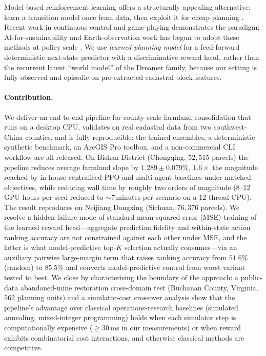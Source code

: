 \documentclass[11pt]{article}
\begin{document}
Model-based reinforcement learning offers a structurally appealing alternative: learn a transition model once from data, then exploit it for cheap planning \citep{chua2018deep,janner2019trust}. Recent work in continuous control \citep{hafner2025dreamerv3,hansen2024tdmpc2} and game-playing \citep{schrittwieser2020muzero,silver2017mastering} demonstrates the paradigm; AI-for-sustainability and Earth-observation work has begun to adopt these methods at policy scale \citep{rolnick2022tackling,reichstein2019deep,tuia2024artificial}. We use \emph{learned planning model} for a feed-forward deterministic next-state predictor with a discriminative reward head, rather than the recurrent latent ``world model'' of the Dreamer family, because our setting is fully observed and episodic on pre-extracted cadastral block features.

\paragraph{Contribution.} We deliver an end-to-end pipeline for county-scale farmland consolidation that runs on a desktop CPU, validates on real cadastral data from two southwest-China counties, and is fully reproducible: the trained ensembles, a deterministic synthetic benchmark, an ArcGIS Pro toolbox, and a non-commercial CLI workflow are all released. On Bishan District (Chongqing, $52{,}515$ parcels) the pipeline reduces average farmland slope by $1.289 \pm 0.079\%$, $1.6\times$ the magnitude reached by in-house centralised-PPO and multi-agent baselines under matched objectives, while reducing wall time by roughly two orders of magnitude (8--12 GPU-hours per seed reduced to $\sim$7\,minutes per scenario on a 12-thread CPU). The result reproduces on Neijiang Dongxing (Sichuan, $76{,}376$ parcels). We resolve a hidden failure mode of standard mean-squared-error (MSE) training of the learned reward head---aggregate prediction fidelity and within-state action ranking accuracy are not constrained against each other under MSE, and the latter is what model-predictive top-$K$ selection actually consumes---via an auxiliary pairwise large-margin term \citep{burges2005learning,joachims2002optimizing} that raises ranking accuracy from $51.6\%$ (random) to $85.5\%$ and converts model-predictive control from worst variant tested to best. We close by characterising the boundary of the approach: a public-data abandoned-mine restoration cross-domain test (Buchanan County, Virginia, $562$ planning units) and a simulator-cost crossover analysis show that the pipeline's advantage over classical operations-research baselines (simulated annealing, mixed-integer programming) holds when each simulator step is computationally expensive ($\geq 30$\,ms in our measurements) or when reward exhibits combinatorial cost interactions, and otherwise classical methods are competitive.
\end{document}
